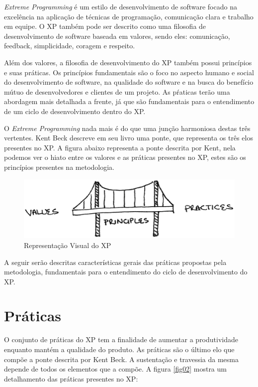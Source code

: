 \textit{Extreme Programming} é um estilo de desenvolvimento de software focado na excelência na aplicação de técnicas de programação, comunicação clara e trabalho em equipe. O XP também pode ser descrito como uma filosofia de desenvolvimento de software baseada em valores, sendo eles: comunicação, feedback, simplicidade, coragem e respeito. \cite{Beck:1999}

Além dos valores, a filosofia de desenvolvimento do XP também possui princípios e suas práticas. Os princípios fundamentais são o foco no aspecto humano e social do desenvolvimento de software, na qualidade do software e na busca do benefício mútuo  de desenvolvedores e clientes de um projeto.\cite{Beck:2004} As pŕaticas terão uma abordagem mais detalhada a frente, já que são fundamentais para o entendimento de um ciclo de desenvolvimento dentro do XP.

O \textit{Extreme Programming} nada mais é do que uma junção harmoniosa destas três vertentes. Kent Beck descreve em seu livro uma ponte, que representa os três elos presentes no XP. A figura abaixo representa a ponte descrita por Kent, nela podemos ver o hiato entre os valores e as práticas presentes no XP,  estes são os princípios presentes na metodologia.\cite{Beck:2004}

\begin{figure}[h]
	\centering
		\includegraphics[keepaspectratio=true,scale=0.7]{figuras/fig01.eps}
	\caption{Representação Visual do XP \cite{Beck:2004}}
	\label{fig01}
\end{figure}

A seguir serão descritas características gerais das práticas propostas pela metodologia, fundamentais para o entendimento do ciclo de desenvolvimento do XP.

\section{Práticas}

O conjunto de práticas do XP tem a finalidade de aumentar a produtividade enquanto mantém a qualidade do produto. \cite{Maurer:2002} As práticas são o último elo que compõe a ponte descrita por Kent Beck. A sustentação e travessia da mesma depende de todos os elementos que a compõe. A figura \ref{fig02} mostra um detalhamento das práticas presentes no XP:

